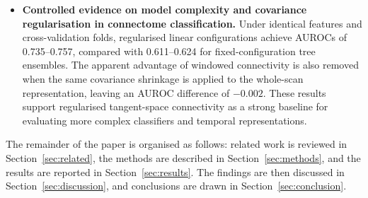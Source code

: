 \begin{itemize}
\item \textbf{Controlled evidence on model complexity and covariance regularisation in connectome classification.}
Under identical features and cross-validation folds, regularised linear configurations achieve AUROCs of 0.735--0.757, compared with 0.611--0.624 for fixed-configuration tree ensembles. The apparent advantage of windowed connectivity is also removed when the same covariance shrinkage is applied to the whole-scan representation, leaving an AUROC difference of $-0.002$. These results support regularised tangent-space connectivity as a strong baseline for evaluating more complex classifiers and temporal representations.


\end{itemize}
The remainder of the paper is organised as follows: related work is reviewed in
Section~\ref{sec:related}, the methods are described in
Section~\ref{sec:methods}, and the results are reported in Section~\ref{sec:results}.
The findings are then discussed in Section~\ref{sec:discussion}, and conclusions are drawn in
Section~\ref{sec:conclusion}.
